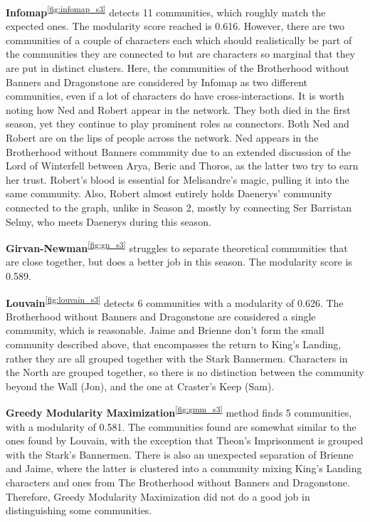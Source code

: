 \documentclass[10pt,twocolumn,letterpaper]{article}
\begin{document}
\textbf{Infomap}\textsuperscript{\ref{fig:infomap_s3}} detects 11 communities, which roughly match the expected ones. The modularity score reached is 0.616. However, there are two communities of a couple of characters each which should realistically be part of the communities they are connected to but are characters so marginal that they are put in distinct clusters. Here, the communities of the Brotherhood without Banners and Dragonstone are considered by Infomap as two different communities, even if a lot of characters do have cross-interactions. It is worth noting how Ned and Robert appear in the network. They both died in the first season, yet they continue to play prominent roles as connectors. Both Ned and Robert are on the lips of people across the network. Ned appears in the Brotherhood without Banners community due to an extended discussion of the Lord of Winterfell between Arya, Beric and Thoros, as the latter two try to earn her trust. Robert’s blood is essential for Melisandre’s magic, pulling it into the same community. Also, Robert almost entirely holds Daenerys' community connected to the graph, unlike in Season 2, mostly by connecting Ser Barristan Selmy, who meets Daenerys during this season.

\textbf{Girvan-Newman}\textsuperscript{\ref{fig:gn_s3}} struggles to separate theoretical communities that are close together, but does a better job in this season. The modularity score is 0.589.

\textbf{Louvain}\textsuperscript{\ref{fig:louvain_s3}} detects 6 communities with a modularity of 0.626. The Brotherhood without Banners and Dragonstone are considered a single community, which is reasonable. Jaime and Brienne don't form the small community described above, that encompasses the return to King's Landing, rather they are all grouped together with the Stark Bannermen. Characters in the North are grouped together, so there is no distinction between the community beyond the Wall (Jon), and the one at Craster's Keep (Sam).

\textbf{Greedy Modularity Maximization}\textsuperscript{\ref{fig:gmm_s3}} method finds 5 communities, with a modularity of 0.581. The communities found are somewhat similar to the ones found by Louvain, with the exception that Theon's Imprisonment is grouped with the Stark's Bannermen. There is also an unexpected separation of Brienne and Jaime, where the latter is clustered into a community mixing King's Landing characters and ones from The Brotherhood without Banners and Dragonstone. Therefore, Greedy Modularity Maximization did not do a good job in distinguishing some communities.
\end{document}
